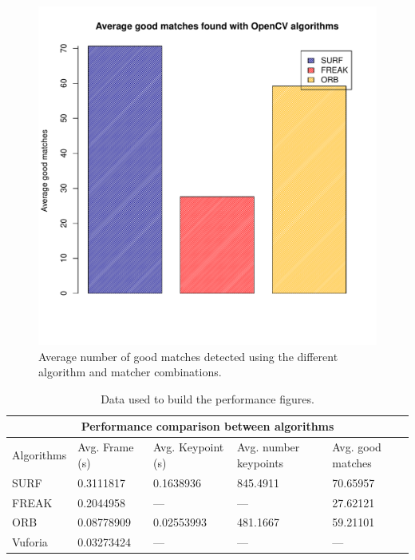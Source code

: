 \begin{figure}
\centering
\includegraphics[scale=0.75]{performance/goodmatches.pdf}
\caption{\label{fig:goodmatches} Average number of good matches detected using the
  different algorithm and matcher combinations.}
\end{figure} 

\begin{center}
\renewcommand{\arraystretch}{1.5}
\begin{table}
\begin{tabular}{|l|p{2.45cm}|p{2.45cm}|p{2.45cm}|p{2.45cm}|}
\hline\hline
\multicolumn{5}{|c|}{\large\bfseries Performance comparison between algorithms}
\\ \hline
\sffamily Algorithms & \sffamily Avg. Frame (s) & \sffamily Avg. Keypoint (s) & \sffamily Avg. number
keypoints & \sffamily Avg. good matches \\ \hline
SURF & 0.3111817 & 0.1638936 & 845.4911 & 70.65957 \\ \hline
FREAK & 0.2044958 & --- & --- & 27.62121 \\ \hline
ORB & 0.08778909 & 0.02553993 & 481.1667 & 59.21101 \\ \hline
Vuforia & 0.03273424 & --- & --- & --- \\ \hline\hline
\end{tabular}
\caption{Data used to build the performance figures.}
\end{table}
\end{center}

